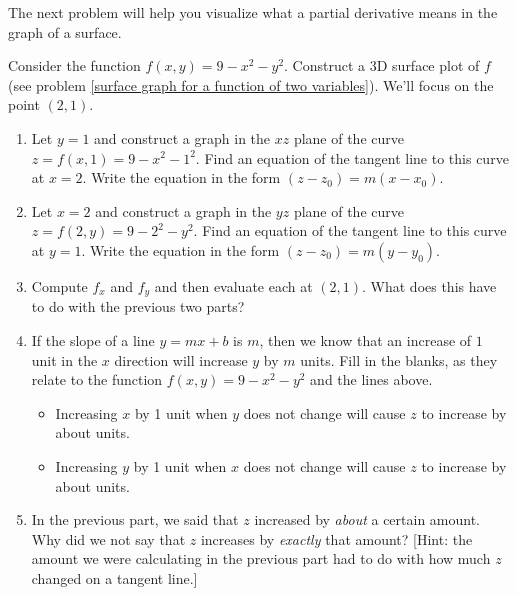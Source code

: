 The next problem will help you visualize what a partial derivative means in the graph of a surface.
\begin{problem} \label{cake introduction}%
%
 Consider the function $f(x,y)=9-x^2-y^2$.  Construct a 3D surface plot of $f$ (see problem \ref{surface graph for a function of two variables}). We'll focus on the point $(2,1)$.
\begin{enumerate}
 \item Let $y=1$ and construct a graph in the $xz$ plane of the curve $z=f(x,1)=9-x^2-1^2$. Find an equation of the tangent line to this curve at $x=2$. Write the equation in the form $(z-z_0)=m(x-x_0)$.
 \item Let $x=2$ and construct a graph in the $yz$ plane of the curve $z=f(2,y)=9-2^2-y^2$. Find an equation of the tangent line to this curve at $y=1$. Write the equation in the form $(z-z_0)=m(y-y_0)$.
 \item Compute $f_x$ and $f_y$ and then evaluate each at $(2,1)$.  What does this have to do with the previous two parts?
 \item If the slope of a line $y=mx+b$ is $m$, then we know that an increase of $1$ unit in the $x$ direction will increase $y$ by $m$ units. Fill in the blanks, as they relate to the function $f(x,y)=9-x^2-y^2$ and the lines above.
\begin{itemize}
 \item Increasing $x$ by 1 unit when $y$ does not change will cause $z$ to increase by about \blank{1cm} units.
 \item Increasing $y$ by 1 unit when $x$ does not change will cause $z$ to increase by about \blank{1cm} units.
\end{itemize}
\item In the previous part, we said that $z$ increased by \emph{about} a certain amount.  Why did we not say that $z$ increases by \emph{exactly} that amount? [Hint: the amount we were calculating in the previous part had to do with how much $z$ changed on a tangent line.]
\end{enumerate}
\end{problem}

